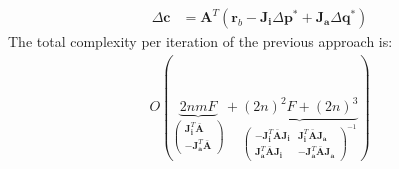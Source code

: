 \begin{equation}
    \begin{aligned}
        \Delta\mathbf{c} & = \mathbf{A}^T \left( \mathbf{r}_b - \mathbf{J}_{\mathbf{i}} \Delta\mathbf{p}^* + \mathbf{J}_{\mathbf{a}} \Delta\mathbf{q}^* \right)
    \label{eq:bidirectional_schur_solution2}
    \end{aligned}
\end{equation}
The total complexity per iteration of the previous approach is:
\begin{equation}
    \begin{aligned}
        O(
        \underbrace{2nmF}_{
        \begin{pmatrix}
            \mathbf{J}_{\mathbf{i}}^T\bar{\mathbf{A}}
            \\
            -\mathbf{J}_{\mathbf{a}}^T\bar{\mathbf{A}}
        \end{pmatrix}}
	    +
        \underbrace{(2n)^2F + (2n)^3}_{
        \begin{pmatrix}
            -\mathbf{J}_{\mathbf{i}}^T \bar{\mathbf{A}}\mathbf{J}_{\mathbf{i}} & \mathbf{J}_{\mathbf{i}}^T \bar{\mathbf{A}}\mathbf{J}_{\mathbf{a}}
            \\
            \mathbf{J}_{\mathbf{a}}^T \bar{\mathbf{A}}\mathbf{J}_{\mathbf{i}} & -\mathbf{J}_{\mathbf{a}}^T \bar{\mathbf{A}}\mathbf{J}_{\mathbf{a}}
        \end{pmatrix}^{-1}}
	    )
    \label{eq:complexity_schur_bidirectional1}
    \end{aligned}
\end{equation}

